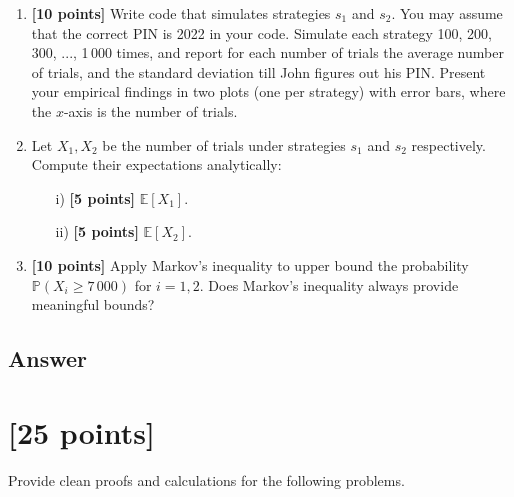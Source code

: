 \begin{tcolorbox}
\begin{enumerate}
    \item  {\bf [10 points] } Write code that simulates strategies $s_1$ and $s_2$. You may assume that the correct PIN is 2022 in your code. Simulate each strategy 100, 200, 300, ..., 1\,000 times, and report for each number of trials the average number of trials, and the standard deviation till John figures out his PIN. Present your empirical findings in two plots (one per strategy) with error bars, where the $x$-axis is the number of trials.  
    \item  Let $X_1,X_2$ be the number of trials under strategies $s_1$ and $s_2$ respectively. Compute their expectations analytically: 
    \begin{itemize}
        \item[i)]   {\bf [5 points] }$ \mathbb{E}[X_1]$.
        \item[ii)]  {\bf [5 points] } $ \mathbb{E}[X_2]$.
    \end{itemize} 


\item  {\bf [10 points] } Apply Markov's inequality to upper bound the probability $\mathbb{P}(X_i \geq 7\,000)$ for $i=1,2$.  Does Markov's inequality always provide meaningful bounds?
\end{enumerate}
\end{tcolorbox}


\subsection{Answer}
\newpage 

\section{ [25 points]} 
 

Provide clean proofs and calculations for the following problems. 

